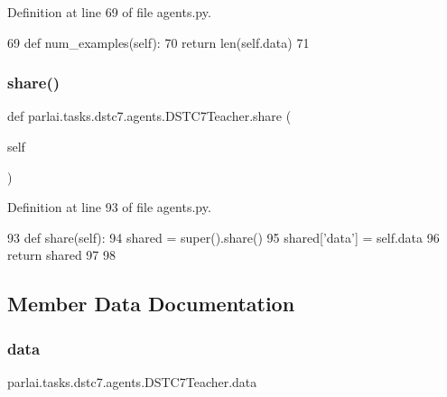 Definition at line 69 of file agents.\+py.


\begin{DoxyCode}
69     \textcolor{keyword}{def }num\_examples(self):
70         \textcolor{keywordflow}{return} len(self.data)
71 
\end{DoxyCode}
\mbox{\label{classparlai_1_1tasks_1_1dstc7_1_1agents_1_1DSTC7Teacher_ae7b7bba23f2f3914186915824280a5d5}} 
\subsubsection{\texorpdfstring{share()}{share()}}
{\footnotesize\ttfamily def parlai.\+tasks.\+dstc7.\+agents.\+D\+S\+T\+C7\+Teacher.\+share (\begin{DoxyParamCaption}\item[{}]{self }\end{DoxyParamCaption})}



Definition at line 93 of file agents.\+py.


\begin{DoxyCode}
93     \textcolor{keyword}{def }share(self):
94         shared = super().share()
95         shared[\textcolor{stringliteral}{'data'}] = self.data
96         \textcolor{keywordflow}{return} shared
97 
98 
\end{DoxyCode}


\subsection{Member Data Documentation}
\mbox{\label{classparlai_1_1tasks_1_1dstc7_1_1agents_1_1DSTC7Teacher_a1410f6e230ea0a01e373e2dde387440a}} 
\subsubsection{\texorpdfstring{data}{data}}
{\footnotesize\ttfamily parlai.\+tasks.\+dstc7.\+agents.\+D\+S\+T\+C7\+Teacher.\+data}



